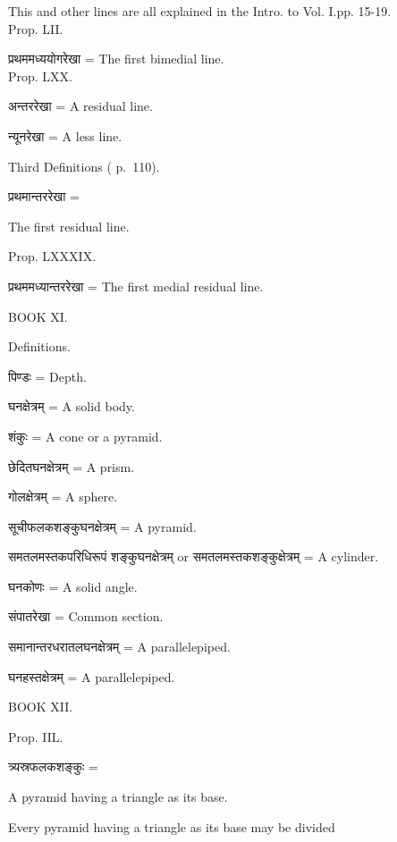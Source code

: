 \documentclass[11pt, openany]{book}
\begin{document}
\newpage
{\en This and other lines are all explained in the Intro. to Vol. I.pp. 15-19.\\

\noindent Prop. LII.}

प्रथममध्ययोगरेखा = {\en The first bimedial line.\\
\noindent Prop. LXX.}

अन्तररेखा = {\en A residual line.}\\

न्यूनरेखा = {\en A less line.}
\begin{center}
{\en Third Definitions ( p.~110).}
\end{center}

प्रथमान्तररेखा = {\en The first residual line.

\noindent Prop. LXXXIX.}

 प्रथममध्यान्तररेखा = {\en The first medial residual line.}
\begin{center}
{\en BOOK XI.
\vspace{3mm}

Definitions.}
\end{center}

 पिण्डः = {\en Depth.}

 घनक्षेत्रम् = {\en A solid body.}

 शंकुः = {\en A cone or a pyramid.}

 छेदितघनक्षेत्रम् = {\en A prism.}

 गोलक्षेत्रम् = {\en A sphere.}

 सूचीफलकशङ्कुघनक्षेत्रम् = {\en A pyramid.}

 समतलमस्तकपरिधिरूपं शङ्कुघनक्षेत्रम् or समतलमस्तकशङ्कुक्षेत्रम् = {\en A
\indent cylinder.}

 घनकोणः = {\en A solid angle.}\\


 संपातरेखा = {\en Common section.}\\


 समानान्तरधरातलघनक्षेत्रम् = {\en A parallelepiped.}


 घनहस्तक्षेत्रम् = {\en A parallelepiped.}
\begin{center}
{\en BOOK XII.}
\end{center}
{\en Prop. IIL.}

 त्र्यस्रफलकशङ्कुः = {\en A pyramid having a triangle as its base.

Every pyramid having a triangle as its base may be divided}
\end{document}

